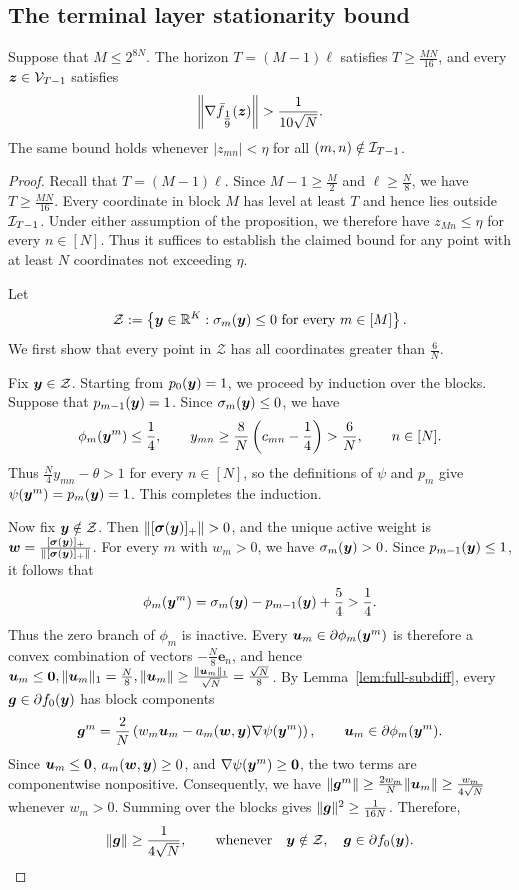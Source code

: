 \subsection{The terminal layer stationarity bound} 
\begin{proposition}
\label{prop:terminal-stationarity}
Suppose that $M\le2^{8N}$.
{The horizon $T=(M-1)\ell$ satisfies $T\ge\tfrac{MN}{16}$,
and every $\bm{z}\in{\cal V}_{T-1}$ satisfies}
\[
 \left\|\nabla \bar f_{\tfrac19}(\bm{z})\right\|
 >\frac1{10\sqrt N}.
\]
The same bound holds whenever
$|z_{mn}|<\eta$ for all $(m,n)\notin{\cal I}_{T-1}$.
\end{proposition}
\begin{proof}
{Recall that $T=(M-1)\ell$.}
Since $M-1\ge\tfrac M2$ and $\ell\ge\tfrac N8$,
we have $T\ge \tfrac{MN}{16}$.
Every coordinate in block $M$ has level at least $T$
and hence lies outside ${\cal I}_{T-1}$.
Under either assumption of the proposition,
we therefore have $z_{Mn}\le\eta$ for every $n\in[N]$.
Thus it suffices to establish the claimed bound
for any point with at least $N$ coordinates
not exceeding $\eta$.

Let
\[
 \mathcal Z
 :=
 \left\{
 \bm{y}\in{\mathbb{R}}^K:
 \sigma_m(\bm{y})\le0
 \text{ for every }m\in[M]
 \right\}.
\]
We first show that every point in $\mathcal Z$
has all coordinates greater than $\tfrac6N$.

Fix $\bm{y}\in\mathcal Z$.
Starting from $p_0(\bm{y})=1$, we proceed by induction
over the blocks.
Suppose that $p_{m-1}(\bm{y})=1$.
Since $\sigma_m(\bm{y})\le0$, we have
\[
 \phi_m(\bm{y}^m)\le\frac14,
 \qquad
 y_{mn}\ge\frac8N\left(c_{mn}-\frac14\right)
 >\frac6N,
 \qquad n\in[N].
\]
Thus $\tfrac N4y_{mn}-\theta>1$ for every $n\in[N]$,
so the definitions of $\psi$ and $p_m$ give
$\psi(\bm{y}^m)=p_m(\bm{y})=1$.
This completes the induction.

Now fix $\bm{y}\notin\mathcal Z$.
Then $\|[\boldsymbol\sigma(\y)]_+\|>0$, and the
unique active weight is $ \bm w
 =
 \frac{[\boldsymbol\sigma(\bm{y})]_+}
 {\|[\boldsymbol\sigma(\bm{y})]_+\|}$. 
For every $m$ with $w_m>0$, we have
$\sigma_m(\bm{y})>0$.
Since $p_{m-1}(\bm{y})\le1$, it follows that
\[
 \phi_m(\bm{y}^m)
 =\sigma_m(\bm{y})-p_{m-1}(\bm{y})+\frac54
 >\frac14.
\]
Thus the zero branch of $\phi_m$ is inactive.
Every $\bm u_m\in\partial\phi_m(\bm{y}^m)$ is therefore
a convex combination of vectors
$-\tfrac N8\bm e_n$, and hence $ \bm u_m\le{\mathbf 0},  \|\bm u_m\|_1=\tfrac N8,  \|\bm u_m\|
 \ge\tfrac{\|\bm u_m\|_1}{\sqrt N}
 =\tfrac{\sqrt N}{8}$.
By Lemma~\ref{lem:full-subdiff}, every
$\bm{g}\in\partial f_0(\bm{y})$ has block components
\[
 \bm{g}^m
 =
 \frac2N
 \left(
 w_m\bm u_m
 -
 a_m(\bm w,\bm{y})\nabla\psi(\bm{y}^m)
 \right),
 \qquad
 \bm u_m\in\partial\phi_m(\bm{y}^m).
\]
Since $\bm u_m\le{\mathbf 0}$,
$a_m(\bm w,\bm{y})\ge0$, and
$\nabla\psi(\bm{y}^m)\ge{\mathbf 0}$, the two terms are
componentwise nonpositive. Consequently, we have $\|\bm{g}^m\|
 \ge\tfrac{2w_m}{N}\|\bm u_m\|
 \ge\tfrac{w_m}{4\sqrt N}$  whenever $w_m>0$.
Summing over the blocks gives $ \|\bm{g}\|^2 \ge \frac1{16N}$. 
Therefore,
\begin{equation}
 \|\bm{g}\|\ge\frac1{4\sqrt N},
 \qquad \text{whenever} \quad 
 \bm{y}\notin\mathcal Z,\quad
 \bm{g}\in\partial f_0(\bm{y}).
 \label{eq:raw-stationarity}
\end{equation}


\end{proof}
